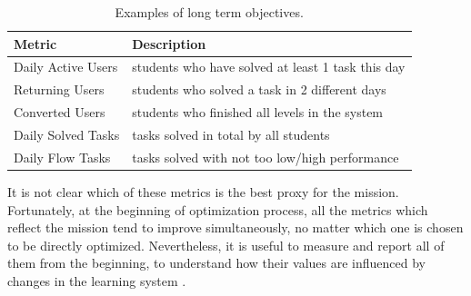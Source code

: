 \begin{table}[htb]
\centering
\begin{tabular}{l l}
\toprule
Metric & Description \\
\midrule
Daily Active Users & students who have solved at least 1 task this day \\
Returning Users & students who solved a task in 2 different days \\
Converted Users & students who finished all levels in the system \\
Daily Solved Tasks & tasks solved in total by all students \\
Daily Flow Tasks & tasks solved with not too low/high performance \\
\bottomrule
\end{tabular}
\caption{Examples of long term objectives.}
\label{tbl:long-term-metrics}
\end{table}

It is not clear which of these metrics is the best proxy for the mission.
Fortunately, at the beginning of optimization process, all the metrics
which reflect the mission tend to improve simultaneously, no matter which one
is chosen to be directly optimized.
Nevertheless, it is useful to measure and report all of them from the beginning,
to understand how their values are influenced by changes in the learning system
\cite[][Rule 2, 12]{google-ml-rules}.




